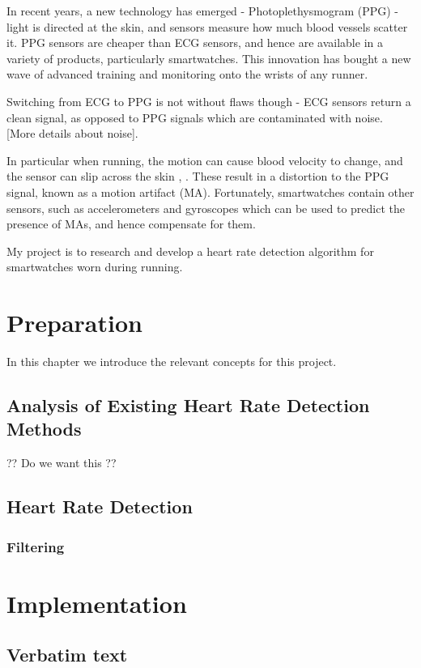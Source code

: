 \documentclass[12pt,a4paper,twoside,openright]{report}
\begin{document}
In recent years, a new technology has emerged - Photoplethysmogram (PPG) 
- light is directed at the skin, and sensors measure how much blood vessels
scatter it. PPG sensors are cheaper than ECG sensors, and hence are 
available in a variety of products, particularly smartwatches. This 
innovation has bought a new wave of advanced training and monitoring onto
the wrists of any runner.

Switching from ECG to PPG is not without flaws though - ECG sensors return a
clean signal, as opposed to PPG signals which are contaminated with
noise. [More details about noise]. 

In particular when running, the motion can cause blood velocity to 
change, and the sensor can slip across the skin \cite{Wijshoff17}, 
\cite{Wood06}. These result in a distortion to the PPG signal, known as a
motion artifact (MA). Fortunately, smartwatches contain other sensors, such
as accelerometers and gyroscopes which can be used to predict the presence of 
MAs, and hence compensate for them.

My project is to research and develop a heart rate detection algorithm
for smartwatches worn during running. 

\chapter{Preparation}

In this chapter we introduce the relevant concepts for this project.


\section{Analysis of Existing Heart Rate Detection Methods}

?? Do we want this ??

\section{Heart Rate Detection}

\subsection{Filtering}


\chapter{Implementation}

\section{Verbatim text}
\end{document}

